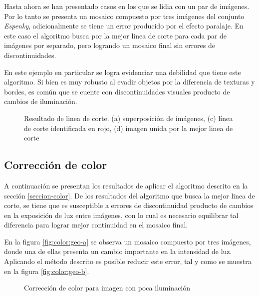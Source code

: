 Hasta ahora se han presentado casos en los que se lidia con un par de imágenes. Por lo tanto se presenta un mosaico compuesto por tres imágenes del conjunto \textit{Espenky}, adicionalmente se tiene un error producido por el efecto paralaje. En este caso el algoritmo busca por la mejor linea de corte para cada par de imágenes por separado, pero logrando un mosaico final sin errores de discontinuidades.

En este ejemplo en particular se logra evidenciar una debilidad que tiene este algoritmo. Si bien es muy robusto al evadir objetos por la diferencia de texturas y bordes, es común que se cuente con discontinuidades visuales producto de cambios de iluminación.

\begin{figure}[H]
	\centering     %
	
	
	\caption[Resultado de linea de corte: \textit{Espenky}]{Resultado de linea de corte. (a) superposición de imágenes, (c) línea de corte identificada en rojo, (d) imagen unida por la mejor linea de corte}
	\label{imagen:cut:espenky}
\end{figure}


\subsection*{Corrección de color}

A continuación se presentan los resultados de aplicar el algoritmo descrito en la sección \ref{seccion-color}. De los resultados del algoritmo que busca la mejor linea de corte, se tiene que es susceptible a errores de discontinuidad producto de cambios en la exposición de luz entre imágenes, con lo cual es necesario equilibrar tal diferencia para lograr mejor continuidad en el mosaico final.

En la figura \ref{fig:color:geo-a} se observa un mosaico compuesto por tres imágenes, donde una de ellas presenta un cambio importante en la intensidad de luz. Aplicando el método descrito es posible reducir este error, tal y como se muestra en la figura \ref{fig:color:geo-b}.

\begin{figure}[H]
	\centering     %
	
	\caption[Resultados de corrección de color: \textit{Grava}]{Corrección de color para imagen con poca iluminación}
	\label{imagen:color:geo}
\end{figure}

